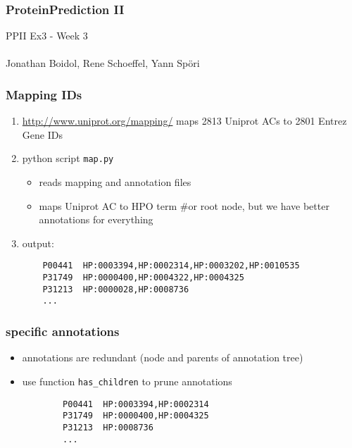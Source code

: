 \documentclass{beamer}
\begin{document}
\begin{frame}
 \frametitle{ProteinPrediction II}
 PPII Ex3 - Week 3\\
 \hfill \\
 Jonathan Boidol, Rene Schoeffel, Yann Sp\"ori
\end{frame}

\begin{frame}[fragile]
 \frametitle{Mapping IDs}
 \begin{enumerate}
 \item \url{http://www.uniprot.org/mapping/} maps 2813 Uniprot ACs to 2801 Entrez Gene IDs
 \item python script \texttt{map.py} 
 	\begin{itemize}
	 \item reads mapping and annotation files
	 \item maps Uniprot AC to HPO term {\color{gray}\#or root node, but we have better annotations for everything}
 	\end{itemize}
 \item output:\\
 \begin{verbatim}
 	P00441  HP:0003394,HP:0002314,HP:0003202,HP:0010535
 	P31749  HP:0000400,HP:0004322,HP:0004325
 	P31213  HP:0000028,HP:0008736
 	...
 \end{verbatim}
\end{enumerate}
\end{frame}

\begin{frame}[fragile]
 \frametitle{specific annotations}

	\begin{itemize}
	\item annotations are redundant (node and parents of annotation tree)
	\item use function \texttt{has\_children} to prune annotations 
\begin{verbatim}
        P00441  HP:0003394,HP:0002314
        P31749  HP:0000400,HP:0004325
        P31213  HP:0008736
        ...
 \end{verbatim}
	\end{itemize}

 
\end{frame}
\end{document}
